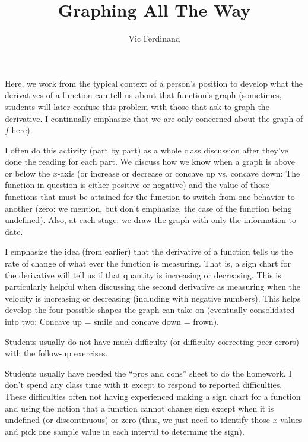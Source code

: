 \documentclass{ximera}
\author{Vic Ferdinand}
\title{Graphing All The Way}
\begin{document}
\begin{abstract}
\end{abstract}
\maketitle

\begin{instructorIntro}
Here, we work from the typical context of a person's position to develop what the derivatives of a function can tell us about that function's graph (sometimes, students will later confuse this problem with those that ask to graph the derivative.  I continually emphasize that we are only concerned about the graph of $f$ here).

I often do this activity (part by part) as a whole class discussion after they've done the reading for each part.  We discuss how we know when a graph is above or below the $x$-axis (or increase or decrease or concave up vs. concave down:  The function in question is either positive or negative) and the value of those functions that must be attained for the function to switch from one behavior to another (zero:  we mention, but don't emphasize, the case of the function being undefined).  Also, at each stage, we draw the graph with only the information to date.

I emphasize the idea (from earlier) that the derivative of a function tells us the rate of change of what ever the function is measuring.  That is, a sign chart for the derivative will tell us if that quantity is increasing or decreasing.  This is particularly helpful when discussing the second derivative as measuring when the velocity is increasing or decreasing (including with negative numbers).  This helps develop the four possible shapes the graph can take on (eventually consolidated into two:  Concave up = smile and concave down = frown).

Students usually do not have much difficulty (or difficulty correcting peer errors) with the follow-up exercises.

Students usually have needed the ``pros and cons'' sheet to do the homework.  I don't spend any class time with it except to respond to reported difficulties.  These difficulties often not having experienced making a sign chart for a function and using the notion that a function cannot change sign except when it is undefined (or discontinuous) or zero (thus, we just need to identify those $x$-values and pick one sample value in each interval to determine the sign).

\end{instructorIntro}
\end{document}
